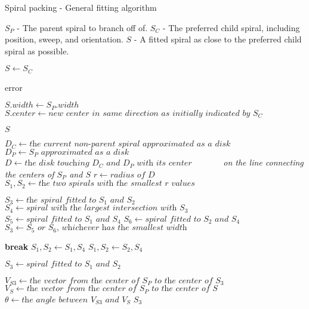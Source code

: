 \documentclass[11pt, oneside]{article}   	%
\begin{document}
\begin{algorithm}[H]
	\caption{Spiral packing - General fitting algorithm}\label{euclid}
	\begin{algorithmic}[1]
		
		\Require $S_{P}$ - The parent spiral to branch off of.
		\Require $S_{C}$ - The preferred child spiral, including position, sweep, and orientation.
		\Ensure $S$ - A fitted spiral as close to the preferred child spiral as possible.
		
			\State $S \gets S_{C}$
			\State
			
				\State \Return error
			\EndIf
			\State
			
				\State $S.width \gets S_{P}.width$
				\State $S.center \gets \textit{new center in same direction as initially indicated by $S_{C}$}$
			\EndIf
			\State
			
				\State \Return $S$
			\EndIf
			\State
			
					\State $D_{C} \gets \textit{the current non-parent spiral approximated as a disk}$ 
					\State $D_{P} \gets \textit{$S_{P}$ approximated as a disk}$
					\State $D \gets \textit{the disk touching $D_{C}$ and $D_{P}$ with its center}$ 
					\State \textit{~~~~~~ on the line connecting the centers of $S_{P}$ and $S$}
					\State $r \gets \textit{radius of $D$}$
					\State $S_{1}, S_{2} \gets \textit{the two spirals with the smallest $r$ values}$
				\EndFor
				\State

				\State $S_{3} \gets \textit{the spiral fitted to $S_{1}$ and $S_{2}$}$
					\State $S_{4} \gets \textit{spiral with the largest intersection with $S_{3}$}$
					\State $S_{5} \gets \textit{spiral fitted to $S_{1}$ and $S_{4}$}$
					\State $S_{6} \gets \textit{spiral fitted to $S_{2}$ and $S_{4}$}$
					\State $S_{3} \gets \textit{$S_{5}$ or $S_{6}$, whichever has the smallest width}$
					\State
					
						\State \textbf{break}
					\Else
							\State $S_{1}, S_{2} \gets S_{1}, S_{4}$
						\Else
							\State $S_{1}, S_{2} \gets S_{2}, S_{4}$
						\EndIf
						\State
						
						\State $S_{3} \gets \textit{spiral fitted to $S_{1}$ and $S_{2}$}$
					\EndIf
				\EndWhile
				\State
				
				\State $V_{S3} \gets \textit{the vector from the center of $S_{P}$ to the center of $S_{3}$}$
				\State $V_{S} \gets \textit{the vector from the center of $S_{P}$ to the center of $S$}$
				\State $\theta \gets \textit{the angle between $V_{S3}$ and $V_{S}$}$
				\If{$\theta \leq 12.5\degree$}
					\State \Return $S_{3}$
				\EndIf
			\EndIf
			\State
	\end{algorithmic}
\end{algorithm}
\end{document}
